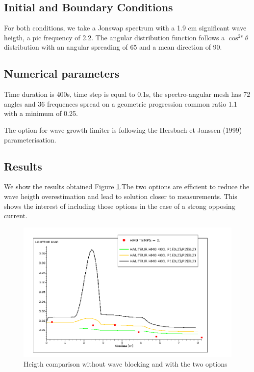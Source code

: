 %
%
\subsection{Initial and Boundary Conditions}
%
For both conditions, we take a Jonswap spectrum with a 1.9 cm significant wave heigth, a pic frequency of 2.2. The angular distribution function follows a $\cos^{2s} \theta$ distribution with an angular spreading of 65 and a mean direction of 90.
%
%
\subsection{Numerical parameters}
%
Time duration is 400s, time step is equal to 0.1s, the spectro-angular mesh has 72 angles and 36 frequences spread on a geometric progression common ratio 1.1 with a minimum of 0.25.

The option for wave growth limiter is following the Hersbach et Janssen (1999) parameterisation.

%
%
\subsection{Results}
%
We show the results obtained Figure \ref{reswaveblocking}.The two options are efficient to reduce the wave heigth overestimation and lead to solution closer to measurements. This shows the interest of including those options in the case of a strong opposing current.

\begin{figure} [!h]
\centering
\includegraphics[scale = 0.4]{hauteur.png}
 \caption{Heigth comparison without wave blocking and with the two options}
\label{reswaveblocking}
\end{figure}




